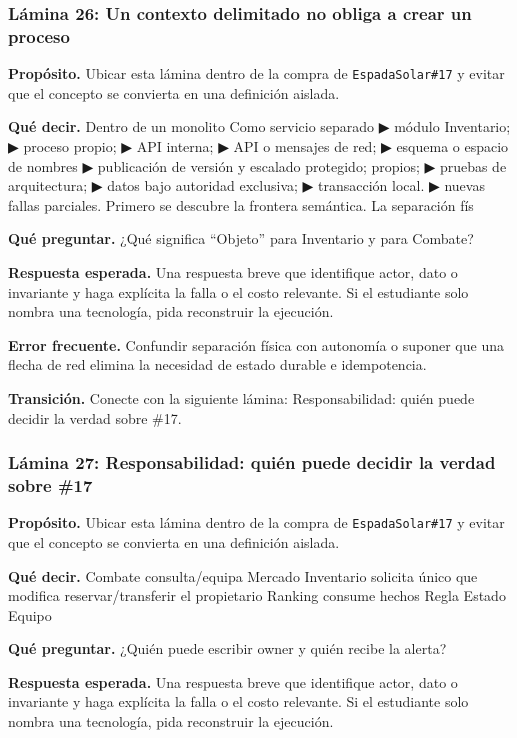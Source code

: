 \documentclass[variant=docente,cover=institutional,mode=screen]{ua-engineering-v6-article}
\begin{document}
\subsubsection*{Lámina 26: Un contexto delimitado no obliga a crear un proceso}
\textbf{Propósito.} Ubicar esta lámina dentro de la compra de \texttt{EspadaSolar\#17} y evitar que el concepto se convierta en una definición aislada.

\textbf{Qué decir.} Dentro de un monolito Como servicio separado ▶ módulo Inventario; ▶ proceso propio; ▶ API interna; ▶ API o mensajes de red; ▶ esquema o espacio de nombres ▶ publicación de versión y escalado protegido; propios; ▶ pruebas de arquitectura; ▶ datos bajo autoridad exclusiva; ▶ transacción local. ▶ nuevas fallas parciales. Primero se descubre la frontera semántica. La separación fís

\textbf{Qué preguntar.} ¿Qué significa “Objeto” para Inventario y para Combate?

\textbf{Respuesta esperada.} Una respuesta breve que identifique actor, dato o invariante y haga explícita la falla o el costo relevante. Si el estudiante solo nombra una tecnología, pida reconstruir la ejecución.

\textbf{Error frecuente.} Confundir separación física con autonomía o suponer que una flecha de red elimina la necesidad de estado durable e idempotencia.

\textbf{Transición.} Conecte con la siguiente lámina: Responsabilidad: quién puede decidir la verdad sobre \#17.

\subsubsection*{Lámina 27: Responsabilidad: quién puede decidir la verdad sobre \#17}
\textbf{Propósito.} Ubicar esta lámina dentro de la compra de \texttt{EspadaSolar\#17} y evitar que el concepto se convierta en una definición aislada.

\textbf{Qué decir.} Combate consulta/equipa Mercado Inventario solicita único que modifica reservar/transferir el propietario Ranking consume hechos Regla Estado Equipo

\textbf{Qué preguntar.} ¿Quién puede escribir owner y quién recibe la alerta?

\textbf{Respuesta esperada.} Una respuesta breve que identifique actor, dato o invariante y haga explícita la falla o el costo relevante. Si el estudiante solo nombra una tecnología, pida reconstruir la ejecución.
\end{document}
